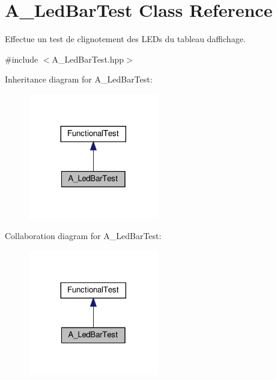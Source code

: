 \hypertarget{classA__LedBarTest}{}\section{A\+\_\+\+Led\+Bar\+Test Class Reference}
\label{classA__LedBarTest}


Effectue un test de clignotement des L\+E\+Ds du tableau d\textquotesingle{}affichage.  




{\ttfamily \#include $<$A\+\_\+\+Led\+Bar\+Test.\+hpp$>$}



Inheritance diagram for A\+\_\+\+Led\+Bar\+Test\+:
\nopagebreak
\begin{figure}[H]
\begin{center}
\leavevmode
\includegraphics[width=161pt]{classA__LedBarTest__inherit__graph}
\end{center}
\end{figure}


Collaboration diagram for A\+\_\+\+Led\+Bar\+Test\+:
\nopagebreak
\begin{figure}[H]
\begin{center}
\leavevmode
\includegraphics[width=161pt]{classA__LedBarTest__coll__graph}
\end{center}
\end{figure}
